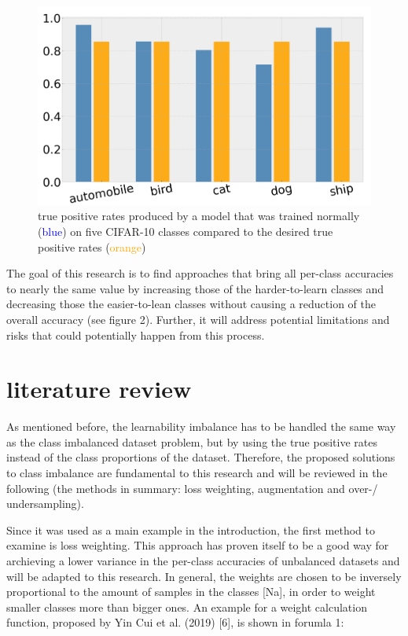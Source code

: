 \documentclass[journal]{IEEEtran}
\begin{document}
\begin{figure}[h!]
        \includegraphics[width=\linewidth]{images/tp_comparison.png}
        \caption{true positive rates produced by a model that was trained normally (\textcolor{blue}{blue}) on five CIFAR-10 classes compared to the desired true positive rates (\textcolor{orange}{orange})}
        \label{fig:tp_comparsion}
\end{figure}

The goal of this research is to find approaches that bring all per-class accuracies to nearly the same value by increasing those of the harder-to-learn classes
and decreasing those the easier-to-lean classes without causing a reduction of the overall accuracy (see figure 2).
Further, it will address potential limitations and risks that could potentially happen from this process.

\section{literature review}
As mentioned before, the learnability imbalance has to be handled the same way as the class imbalanced dataset problem, but by using the true positive rates instead of the class proportions of the dataset.
Therefore, the proposed solutions to class imbalance are fundamental to this research and will be reviewed in the following (the methods in summary: loss weighting, augmentation and over-/ undersampling).

Since it was used as a main example in the introduction, the first method to examine is loss weighting. 
This approach has proven itself to be a good way for archieving a lower variance in the per-class accuracies of unbalanced datasets and will be adapted to this research. 
In general, the weights are chosen to be inversely proportional to the amount of samples in the classes [Na], in order to weight smaller classes more than bigger ones. 
An example for a weight calculation function, proposed by Yin Cui et al. (2019) [6], is shown in forumla 1:
\end{document}
